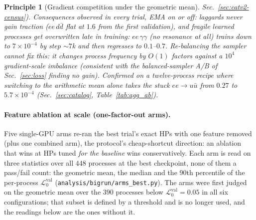 \documentclass[11pt]{article}
\newcommand{\vlnr}{\mathcal{L}^{\mathrm{val}}_{0}}   %
\newcommand{\code}[1]{\texttt{#1}}
\newtheorem{principle}{Principle}
\begin{document}
\begin{principle}[Gradient competition under the geometric mean]
Sec.~\ref{sec:catv2-census}). Consequences observed in every trial,
EMA on or off: laggards never gain traction ($ee\,d\bar d$ flat at $1.6$ from the first
validation), and fragile \emph{learned} processes get overwritten late in training:
$ee\,\gamma\gamma$ (no resonance at all) trains down to $7\times10^{-4}$ by step $\sim\!7$k and
then regresses to $0.1$--$0.7$. Re-balancing the \emph{sampler} cannot fix this: it changes
process frequency by $O(1)$ factors against a $10^4$ gradient-scale imbalance (consistent with the
balanced-sampler A/B of Sec.~\ref{sec:loss} finding no gain). Confirmed on a twelve-process
recipe where switching to the arithmetic mean alone takes the stuck $ee\to u\bar u$ from
$0.27$ to $5.7\times10^{-4}$ (Sec.~\ref{sec:catalog}, Table~\ref{tab:agg_ab}).
\end{principle}

\paragraph{Feature ablation at scale (one-factor-out arms).} Five single-GPU arms re-ran the best
trial's exact HPs with one feature removed (plus one combined arm), the protocol's cheap-shortcut
direction: an ablation that wins at HPs tuned \emph{for the baseline} wins conservatively. Each
arm is read on three statistics over all $448$ processes at the best checkpoint, none of them a
pass/fail count: the geometric mean, the median and the $90$th percentile of the per-process
$\vlnr$ (\code{analysis/bigrun/arms\_best.py}). The arms were first judged on the geometric mean
over the $390$ processes below $\vlnr=0.05$ in all six configurations; that subset is defined by a
threshold and is no longer used, and the readings below are the ones without it.
\end{document}
